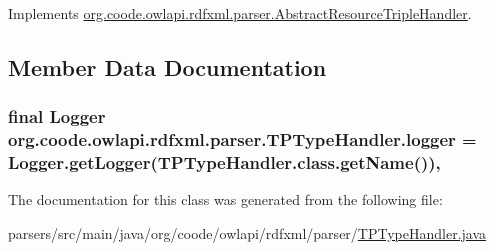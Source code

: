 Implements \hyperlink{classorg_1_1coode_1_1owlapi_1_1rdfxml_1_1parser_1_1_abstract_resource_triple_handler_acfa19ca318d5aaf7fc66e361ba02e7e8}{org.\-coode.\-owlapi.\-rdfxml.\-parser.\-Abstract\-Resource\-Triple\-Handler}.



\subsection{Member Data Documentation}
\hypertarget{classorg_1_1coode_1_1owlapi_1_1rdfxml_1_1parser_1_1_t_p_type_handler_a79307f5286349c0a0519c1b943a5d0ea}{
\subsubsection[{logger}]{\setlength{\rightskip}{0pt plus 5cm}final Logger org.\-coode.\-owlapi.\-rdfxml.\-parser.\-T\-P\-Type\-Handler.\-logger = Logger.\-get\-Logger(T\-P\-Type\-Handler.\-class.\-get\-Name())\hspace{0.3cm}{\ttfamily [static]}, {\ttfamily [private]}}}\label{classorg_1_1coode_1_1owlapi_1_1rdfxml_1_1parser_1_1_t_p_type_handler_a79307f5286349c0a0519c1b943a5d0ea}


The documentation for this class was generated from the following file\-:\begin{DoxyCompactItemize}
\item 
parsers/src/main/java/org/coode/owlapi/rdfxml/parser/\hyperlink{_t_p_type_handler_8java}{T\-P\-Type\-Handler.\-java}\end{DoxyCompactItemize}
